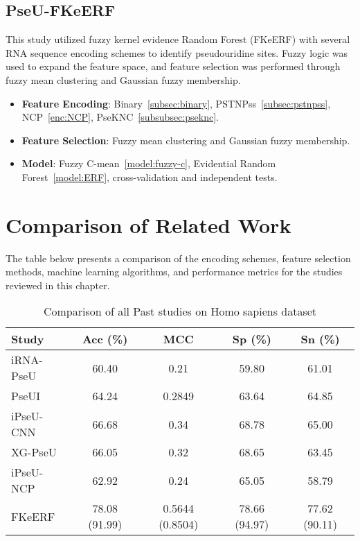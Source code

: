     \subsection*{PseU-FKeERF \cite{chen_fuzzy_2024}}\label{subsec:PseU-FKeERF}
      This study utilized fuzzy kernel evidence Random Forest (FKeERF) with several RNA sequence encoding schemes to identify pseudouridine sites.
      Fuzzy logic was used to expand the feature space, and feature selection was performed through fuzzy mean clustering and Gaussian fuzzy membership.

      \begin{itemize}
        \item \textbf{Feature Encoding}: Binary~\ref{subsec:binary}, PSTNPss~\ref{subsec:pstnpss}, NCP~\ref{enc:NCP}, PseKNC~\ref{subsubsec:pseknc}.
        \item \textbf{Feature Selection}: Fuzzy mean clustering and Gaussian fuzzy membership.
        \item \textbf{Model}: Fuzzy C-mean~\ref{model:fuzzy-c}, Evidential Random Forest~\ref{model:ERF}, cross-validation and independent tests.
      \end{itemize}


  \section{Comparison of Related Work}\label{sec:comparison-of-related-work}
    The table below presents a comparison of the encoding schemes, feature selection methods, machine learning algorithms, and performance metrics for the studies reviewed in this chapter.

    \begin{table}[h!]
      \centering
      \begin{tabular}{lcccc}
        \toprule
        \textbf{Study}                           & \textbf{Acc} (\%) & \textbf{MCC}    & \textbf{Sp} (\%) & \textbf{Sn} (\%) \\
        \midrule
        iRNA-PseU\cite{chen_irna-pseu_nodate}    & 60.40             & 0.21            & 59.80            & 61.01            \\
        PseUI\cite{he_pseui_2018}                & 64.24             & 0.2849          & 63.64            & 64.85            \\
        iPseU-CNN\cite{tahir_ipseu-cnn_nodate}   & 66.68             & 0.34            & 68.78            & 65.00            \\
        XG-PseU\cite{liu_xg-pseu_2020}           & 66.05             & 0.32            & 68.65            & 63.45            \\
        iPseU-NCP\cite{nguyen-vo_ipseu-ncp_2019} & 62.92             & 0.24            & 65.05            & 58.79            \\
        FKeERF\cite{chen_fuzzy_2024}             & 78.08 (91.99)     & 0.5644 (0.8504) & 78.66 (94.97)    & 77.62 (90.11)    \\
        \bottomrule
      \end{tabular}
      \caption{Comparison of all Past studies on Homo sapiens dataset}
      \label{tab:human_comp_table}
    \end{table}

